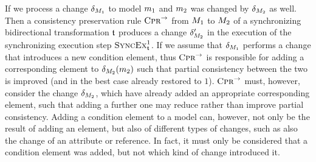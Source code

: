 If we process a change $\delta_{M_{1}}$ to model $m_{1}$ and $m_{2}$ was changed by $\delta_{M_{2}}$ as well.
Then a consistency preservation rule $\textsc{Cpr}_{}^{\rightarrow}$ from $M_{1}$ to $M_{2}$ of a synchronizing bidirectional transformation $\mathfrak{t}$ produces a change $\delta_{M_{2}}'$ in the execution of the synchronizing execution step $\textsc{SyncEx}_{\mathfrak{t}}^1$.
If we assume that $\delta_{M_{1}}$ performs a change that introduces a new condition element, thus $\textsc{Cpr}_{}^{\rightarrow}$ is responsible for adding a corresponding element to $\delta_{M_{2}}(m_{2})$ such that partial consistency between the two is improved (and in the best case already restored to $1$).
$\textsc{Cpr}_{}^{\rightarrow}$ must, however, consider the change $\delta_{M_{2}}$, which have already added an appropriate corresponding element, such that adding a further one may reduce rather than improve partial consistency.
Adding a condition element to a model can, however, not only be the result of adding an element, but also of different types of changes, such as also the change of an attribute or reference.
In fact, it must only be considered that a condition element was added, but not which kind of change introduced it.


